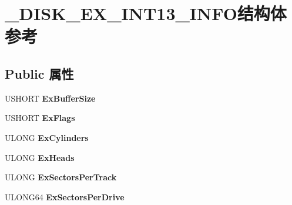 \hypertarget{struct___d_i_s_k___e_x___i_n_t13___i_n_f_o}{}\section{\+\_\+\+D\+I\+S\+K\+\_\+\+E\+X\+\_\+\+I\+N\+T13\+\_\+\+I\+N\+F\+O结构体 参考}
\label{struct___d_i_s_k___e_x___i_n_t13___i_n_f_o}
\subsection*{Public 属性}
\begin{DoxyCompactItemize}
\item 
\mbox{\label{struct___d_i_s_k___e_x___i_n_t13___i_n_f_o_a3f88f27abfb46d83e01b2b05d251ca54}} 
U\+S\+H\+O\+RT {\bfseries Ex\+Buffer\+Size}
\item 
\mbox{\label{struct___d_i_s_k___e_x___i_n_t13___i_n_f_o_a7fa4771b534fc5b2a09e60308f9771fe}} 
U\+S\+H\+O\+RT {\bfseries Ex\+Flags}
\item 
\mbox{\label{struct___d_i_s_k___e_x___i_n_t13___i_n_f_o_a6b2714b3a59ab474b5a6d3af3c655a45}} 
U\+L\+O\+NG {\bfseries Ex\+Cylinders}
\item 
\mbox{\label{struct___d_i_s_k___e_x___i_n_t13___i_n_f_o_a6f01169284ec1bfc15f1a150c0ad37a4}} 
U\+L\+O\+NG {\bfseries Ex\+Heads}
\item 
\mbox{\label{struct___d_i_s_k___e_x___i_n_t13___i_n_f_o_a1ce6ba6ac08ab3332c624945b94e53b7}} 
U\+L\+O\+NG {\bfseries Ex\+Sectors\+Per\+Track}
\item 
\mbox{\label{struct___d_i_s_k___e_x___i_n_t13___i_n_f_o_abc38eb9093688637ce0d4ec463f4b974}} 
U\+L\+O\+N\+G64 {\bfseries Ex\+Sectors\+Per\+Drive}
\item 
\mbox{\label{struct___d_i_s_k___e_x___i_n_t13___i_n_f_o_a4a5f64d88049c9efa0108ab799a6a622}} 

\end{DoxyCompactItemize}
